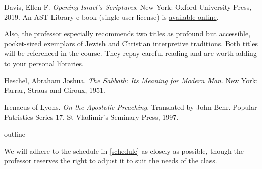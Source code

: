 \documentclass[titlepage]{article}
\begin{document}
\begingroup
\renewcommand{\section}[2]{}%
\begin{thebibliography}{Davis}%

	 Davis, Ellen F.
	\emph{Opening Israel's Scriptures}.
	New York: Oxford University Press, 2019.
	An AST Library e-book (single user license) is \href{https://doi.org/10.1093/oso/9780190260545.001.0001}{available online}.

\end{thebibliography}
\endgroup

Also, the professor especially recommends two titles as profound but
accessible, pocket-sized exemplars of Jewish and Christian interpretive
traditions. Both titles will be referenced in the course. They repay
careful reading and are worth adding to your personal libraries.


\begingroup
\renewcommand{\section}[2]{}%
\begin{thebibliography}{Irenaeus}%

	 Heschel, Abraham Joshua.
	\emph{The Sabbath: Its Meaning for Modern Man}.
	New York: Farrar, Straus and Giroux, 1951.

	 Irenaeus of Lyons.
	\emph{On the Apostolic Preaching}. Translated by John Behr. Popular Patristics Series 17.
	St Vladimir’s Seminary Press, 1997.


\end{thebibliography}
\endgroup


\section{Course Outline}
\label{outline}

We will adhere to the schedule in \autoref{schedule} as closely as
possible, though the professor reserves the right to adjust it to suit
the needs of the class.
\end{document}
